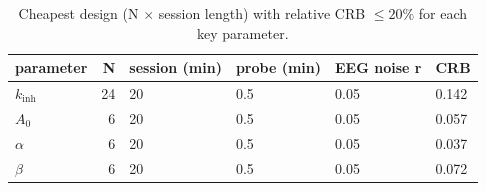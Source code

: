 \begin{table}
\caption{Cheapest design (N $\times$ session length) with relative CRB $\le 20\%$ for each key parameter.}
\label{tab:table3_min_designs}
\begin{tabular}{lrllll}
\toprule
parameter & N & session (min) & probe (min) & EEG noise r & CRB \\
\midrule
$k_{\mathrm{inh}}$ & 24 & 20 & 0.5 & 0.05 & 0.142 \\
$A_0$ & 6 & 20 & 0.5 & 0.05 & 0.057 \\
$\alpha$ & 6 & 20 & 0.5 & 0.05 & 0.037 \\
$\beta$ & 6 & 20 & 0.5 & 0.05 & 0.072 \\
\bottomrule
\end{tabular}
\end{table}
